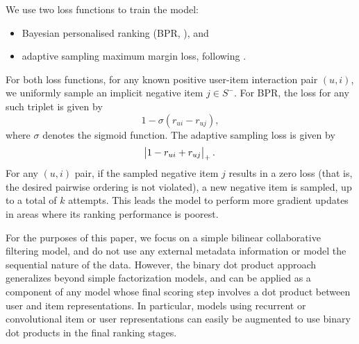 \documentclass[sigchi]{acmart}
\newcommand\symUserInteractionSet{S}
\begin{document}
We use two loss functions to train the model:
\begin{itemize}
\item Bayesian personalised ranking (BPR, \citet{rendle2009bpr}), and
\item adaptive sampling maximum margin loss, following \citet{weston2011wsabie}.
\end{itemize}
For both loss functions, for any known positive user-item interaction pair $(u, i)$, we uniformly sample an implicit negative item $j \in \symUserInteractionSet^-$. For BPR, the loss for any such triplet is given by
\begin{equation}
1 - \sigma\left(r_{ui} - r_{uj}\right),
\end{equation}
where $\sigma$ denotes the sigmoid function.
The adaptive sampling loss is given by
\begin{equation}
\abs{1 - r_{ui} + r_{uj}}_{+}.
\end{equation}
For any $(u, i)$ pair, if the sampled negative item $j$ results in a zero loss (that is, the desired pairwise ordering is not violated), a new negative item is sampled, up to a total of $k$ attempts. This leads the model to perform more gradient updates in areas where its ranking performance is poorest.

For the purposes of this paper, we focus on a simple bilinear collaborative filtering model, and do not use any external metadata information or model the sequential nature of the data. However, the binary dot product approach generalizes beyond simple factorization models, and can be applied as a component of any model whose final scoring step involves a dot product between user and item representations. In particular, models using recurrent \citep{hidasi2015session} or convolutional \citep{lynch2015images} item or user representations can easily be augmented to use binary dot products in the final ranking stages.
\end{document}
